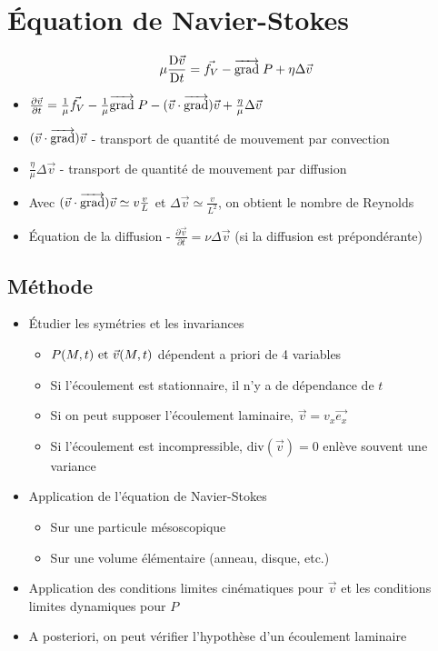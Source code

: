 \documentclass[openany]{book}
\begin{document}
\section{Équation de Navier-Stokes}

\[ \mu \frac{\text{D} \vec{v}}{\text{D} t} = \vec{f_V} - \overrightarrow{{\text{grad}}} \; P + \eta \Delta \vec{v} \]

\begin{itemize}
    \item $ \frac{\partial \vec{v}}{\partial t} = \frac{1}{\mu}\vec{f_V} - \frac{1}{\mu} \overrightarrow{{\text{grad}}} \; P -(\vec{v}\cdot\overrightarrow{{\text{grad}}}) \vec{v} + \frac{\eta}{\mu} \Delta \vec{v} $
    \item $(\vec{v}\cdot\overrightarrow{{\text{grad}}}) \vec{v}$ - transport de quantité de mouvement par convection
    \item $\frac{\eta}{\mu} \Delta \vec{v}$ - transport de quantité de mouvement par diffusion
    \item Avec $(\vec{v}\cdot\overrightarrow{{\text{grad}}})\vec{v} \simeq v \frac{v}{L}$ et $\Delta \vec{v} \simeq \frac{v}{L^2}$, on obtient le nombre de Reynolds
    \item Équation de la diffusion - $\frac{\partial \vec{v}}{\partial t} = \nu \Delta \vec{v}$ (si la diffusion est prépondérante)
\end{itemize}

\subsection{Méthode}
\begin{itemize}
    \item Étudier les symétries et les invariances
    \begin{itemize}
        \item $P(M, t) \text{ et } \vec{v}(M, t)$ dépendent a priori de 4 variables
        \item Si l'écoulement est stationnaire, il n'y a de dépendance de $t$
        \item Si on peut supposer l'écoulement laminaire, $\vec{v} = v_x \vec{e_x}$
        \item Si l'écoulement est incompressible, $\text{div}(\vec{v}) = 0$ enlève souvent une variance
    \end{itemize}
    \item Application de l'équation de Navier-Stokes
    \begin{itemize}
        \item Sur une particule mésoscopique
        \item Sur une volume élémentaire (anneau, disque, etc.)
    \end{itemize}
    \item Application des conditions limites cinématiques pour $\vec{v}$ et les conditions limites dynamiques pour $P$
    \item A posteriori, on peut vérifier l'hypothèse d'un écoulement laminaire
\end{itemize}
\end{document}
